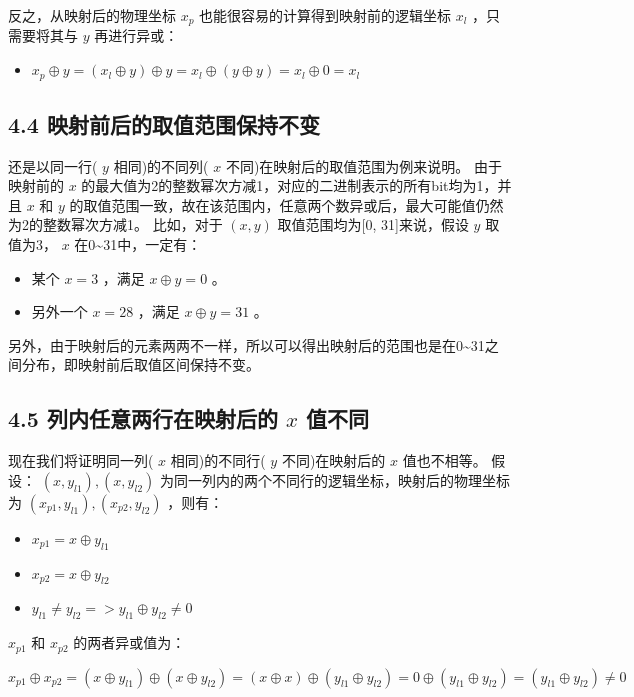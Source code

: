 反之，从映射后的物理坐标 $x_p$ 也能很容易的计算得到映射前的逻辑坐标 $x_l$ ，只需要将其与 $y$ 再进行异或：

\begin{itemize}
  \item $x_p \oplus y = (x_{l}\oplus y)\oplus y = x_{l} \oplus (y \oplus y) = x_{l} \oplus 0 = x_{l}$
\end{itemize}

\subsection{4.4 映射前后的取值范围保持不变}

还是以同一行( $y$ 相同)的不同列( $x$ 不同)在映射后的取值范围为例来说明。
由于映射前的 $x$ 的最大值为2的整数幂次方减1，对应的二进制表示的所有bit均为1，并且 $x$ 和 $y$ 的取值范围一致，故在该范围内，任意两个数异或后，最大可能值仍然为2的整数幂次方减1。
比如，对于 $(x,y)$ 取值范围均为[0, 31]来说，假设 $y$ 取值为3， $x$ 在0\textasciitilde{}31中，一定有：

\begin{itemize}
  \item 某个 $x = 3$ ，满足 $x \oplus y = 0$ 。
  \item 另外一个 $x =28$ ，满足 $x \oplus y = 31$ 。
\end{itemize}

另外，由于映射后的元素两两不一样，所以可以得出映射后的范围也是在0\textasciitilde{}31之间分布，即映射前后取值区间保持不变。

\subsection{4.5 列内任意两行在映射后的 $x$ 值不同}

现在我们将证明同一列( $x$ 相同)的不同行( $y$ 不同)在映射后的 $x$ 值也不相等。
假设： $(x, y_{l1}),(x,y_{l2})$ 为同一列内的两个不同行的逻辑坐标，映射后的物理坐标为 $(x_{p1}, y_{l1}),(x_{p2},y_{l2})$ ，则有：

\begin{itemize}
  \item $x_{p1} = x \oplus y_{l1}$
  \item $x_{p2} = x \oplus y_{l2}$
  \item $y_{l1} \neq y_{l2} => y_{l1} \oplus y_{l2} \neq 0$
\end{itemize}

$x_{p1}$ 和 $x_{p2}$ 的两者异或值为：

\begin{equation*}
x_{p1} \oplus x_{p2} = (x \oplus y_{l1}) \oplus(x \oplus y_{l2}) = (x \oplus x) \oplus (y_{l1} \oplus y_{l2}) = 0 \oplus (y_{l1} \oplus y_{l2}) = (y_{l1} \oplus y_{l2}) \neq 0
\end{equation*}

